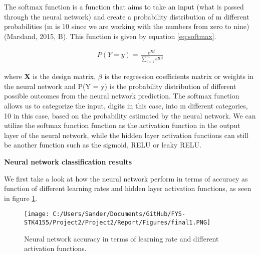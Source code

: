 \documentclass[12pt,a4paper]{article}
\begin{document}
\noindent The softmax function is a function that aims to take an input (what is passed through the neural network) and create a probability distribution of m different probabilities (m is 10 since we are working with the numbers from zero to nine) (Marsland, 2015, B). This function is given by equation \ref{eq:softmax}.

\begin{equation}\label{eq:softmax}
\begin{aligned}
P(Y = y) = \frac{e^{\textbf{X}\beta}}{\sum_{i = 1}^m e^{\textbf{X}\beta}} 
\end{aligned}
\end{equation}

\noindent where \textbf{X} is the design matrix, $\beta$ is the regression coefficients matrix or weights in the neural network and P(Y = y) is the probability distribution of different possible outcomes from the neural network prediction. The softmax function allows us to categorize the input, digits in this case, into m different categories, 10 in this case, based on the probability estimated by the neural network. We can utilize the softmax function function as the activation function in the output layer of the neural network, while the hidden layer activation functions can still be another function such as the sigmoid, RELU or leaky RELU. 

\begin{center}
\large{\textbf{Neural network classification results}}
\end{center}

\noindent We first take a look at how the neural network perform in terms of accuracy as function of different learning rates and hidden layer activation functions, as seen in figure \ref{fig:AccvsLrate}.

\begin{figure}[H]
\centering
\texttt{[image: C:/Users/Sander/Documents/GitHub/FYS-STK4155/Project2/Project2/Report/Figures/final1.PNG]}
\caption{\label{fig:AccvsLrate} Neural network accuracy in terms of learning rate and different activation functions.}
\end{figure}
\end{document}
